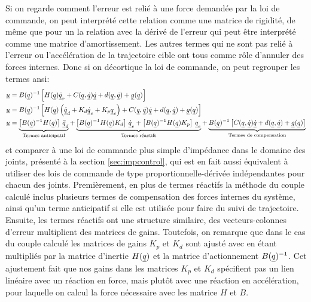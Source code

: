 Si on regarde comment l'erreur est relié à une force demandée par la loi de commande, on peut interprété cette relation comme une matrice de rigidité, de même que pour un la relation avec la dérivé de l'erreur qui peut être interprété comme une matrice d'amortissement. Les autres termes qui ne sont pas relié à l'erreur ou l'accélération de la trajectoire cible ont tous comme rôle d'annuler des forces internes. Donc si on décortique la loi de commande, on peut regrouper les termes ansi:
\begin{align}
\underline{u} &= B(\underline{q})^{-1} \left[  H(\underline{q}) \underline{\ddot{q}}_r + C(\underline{q},\underline{\dot{q}}) \underline{\dot{q}} + d(\underline{q}, \underline{\dot{q}}) + \underline{g}(\underline{q}) \right] \\
\underline{u} &= B(\underline{q})^{-1} \left[  H(\underline{q}) \left( \underline{\ddot{q}}_d + K_d  \underline{\dot{q}}_e  + K_p \underline{q}_e \right) + C(\underline{q},\underline{\dot{q}}) \underline{\dot{q}} + d(\underline{q}, \underline{\dot{q}}) + \underline{g}(\underline{q}) \right] \\
\underline{u} &= 
\underbrace{
\left[ B(\underline{q})^{-1} H(\underline{q})  \right] \, \underline{\ddot{q}}_d 
}_{\text{Termes anticipatif}}
+ 
\underbrace{
\left[ B(\underline{q})^{-1} H(\underline{q}) K_d  \right] \,  \underline{\dot{q}}_e 
+ 
\left[ B(\underline{q})^{-1} H(\underline{q}) K_p   \right] \, \underline{q}_e 
}_{\text{Termes réactifs}}
+
\underbrace{
B(\underline{q})^{-1} \left[ C(\underline{q},\underline{\dot{q}}) \underline{\dot{q}} + d(\underline{q}, \underline{\dot{q}}) + \underline{g}(\underline{q}) \right]
}_{\text{Termes de compensation}}
\end{align}
et comparer à une loi de commande plus simple d'impédance dans le domaine des joints, présenté à la section \ref{sec:impcontrol}, qui est en fait aussi équivalent à utiliser des lois de commande de type proportionnelle-dérivée indépendantes pour chacun des joints. Premièrement, en plus de termes réactifs la méthode du couple calculé inclus plusieurs termes de compensation des forces internes du système, ainsi qu'un terme anticipatif si elle est utilisée pour faire du suivi de trajectoire. Ensuite, les termes réactifs ont une structure similaire, des vecteurs-colonnes d'erreur multiplient des matrices de gains. Toutefois, on remarque que dans le cas du couple calculé les matrices de gains $K_p$ et $K_d$ sont ajusté avec en étant multipliés par la matrice d'inertie $H(\underline{q})$ et la matrice d'actionnement $B(\underline{q})^{-1}$. Cet ajustement fait que nos gains dans les matrices $K_p$ et $K_d$ spécifient pas un lien linéaire avec un réaction en force, mais plutôt avec une réaction en accélération, pour laquelle on calcul la force nécessaire avec les matrice $H$ et $B$.


